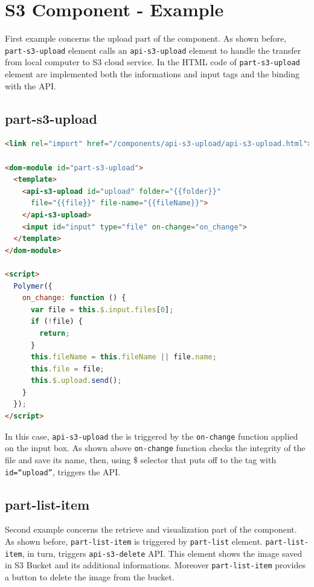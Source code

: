 \section{S3 Component - Example}
\label{sec:S3_exmpl}

First example concerns the upload part of the component.
As shown before, \texttt{part-s3-upload} element calls an \texttt{api-s3-upload} element to handle the transfer from local computer to S3 cloud service.
In the HTML code of \texttt{part-s3-upload} element are implemented both the informations and input tags and the binding with the API.

\subsection{part-s3-upload}

\begin{lstlisting}[language=html]
<link rel="import" href="/components/api-s3-upload/api-s3-upload.html">

<dom-module id="part-s3-upload">
  <template>
    <api-s3-upload id="upload" folder="{{folder}}"
      file="{{file}}" file-name="{{fileName}}">
    </api-s3-upload>
    <input id="input" type="file" on-change="on_change">
  </template>
</dom-module>

<script>
  Polymer({
    on_change: function () {
      var file = this.$.input.files[0];
      if (!file) {
        return;
      }
      this.fileName = this.fileName || file.name;
      this.file = file;
      this.$.upload.send();
    }
  });
</script>

\end{lstlisting}

In this case, \texttt{api-s3-upload} the is triggered by the \texttt{on-change} function applied on the input box. As shown above \texttt{on-change} function checks the integrity of the file and save its name, then, using \$ selector that puts off to the tag with \texttt{id=``upload''}, triggers the API.


\subsection{part-list-item}

Second example concerns the retrieve and visualization part of the component.
As shown before, \texttt{part-list-item} is triggered by \texttt{part-list} element. \texttt{part-list-item}, in turn, triggers \texttt{api-s3-delete} API.
This element shows the image saved in S3 Bucket and its additional informations. Moreover \texttt{part-list-item} provides a button to delete the image from the bucket.

